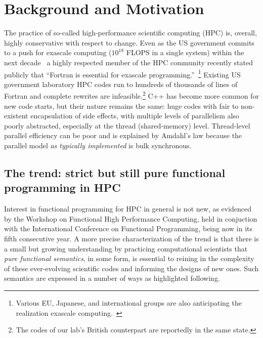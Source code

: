 \documentclass{llncs}
\begin{document}
\section{Background and Motivation}
The practice of so-called high-performance scientific computing (HPC) is,
overall, highly conservative with respect to change.  Even as the US
government commits to a push for exascale computing ($10^{18}$ FLOPS in a
single system) within the next decade~\cite{Exascale-roadmap} a highly
respected member of the HPC community recently stated publicly that ``Fortran
is essential for exascale programming.''~\cite{Heroux16}\footnote{Various EU,
  Japanese, and international groups are also anticipating the realization
  exascale computing.~\cite{EUexascale,Exascale-org}} Existing US government
laboratory HPC codes run to hundreds of thousands of lines of Fortran and
complete rewrites are infeasible.\footnote{The codes of our lab's British
  counterpart are reportedly in the same state.}  C++ has become more common
for new code starts, but their nature remains the same: huge codes with fair
to non-existent encapsulation of side effects, with multiple levels of
parallelism also poorly abstracted, especially at the thread (shared-memory)
level.  Thread-level parallel efficiency can be poor and is explained by
Amdahl's law because the parallel model \emph{as typically implemented} is
bulk synchronous.

\subsection{The trend: strict but still pure functional programming in HPC}
Interest in functional programming for HPC in general is not new, as evidenced
by the Workshop on Functional High Performance Computing, held in conjuction
with the International Conference on Functional Programming, being now in its fifth
consecutive year.  A more precise characterization of the trend is that there
is a small but growing understanding by practicing computational scientists
that \emph{pure functional semantics}, in some form, is essential to reining
in the complexity of these ever-evolving scientific codes and informing the
designs of new ones.  Such semantics are expressed in a number of ways as
highlighted following.
\end{document}
